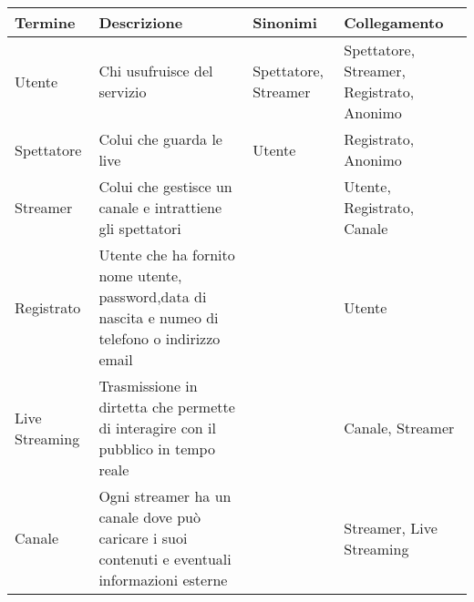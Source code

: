 \begin{center}
  \begin{tabular}{|p{3cm}|p{3cm}|p{3cm}|p{3cm}|}
    \hline
    Termine &Descrizione & Sinonimi &Collegamento \\
    \hline
    Utente& Chi usufruisce del servizio & Spettatore, Streamer & Spettatore, Streamer, Registrato, Anonimo \\
    \hline
    Spettatore & Colui che guarda le live & Utente & Registrato, Anonimo \\ 
    \hline
    Streamer & Colui che gestisce un canale e intrattiene gli spettatori & &Utente, Registrato, Canale\\
    \hline
    Registrato & Utente che ha fornito nome utente, password,data di nascita e numeo di telefono o indirizzo email & &Utente \\
    \hline
    Live Streaming & Trasmissione in dirtetta che permette di interagire con il pubblico in tempo reale &  & Canale, Streamer \\ 
    \hline
    Canale & Ogni streamer ha un canale dove può caricare i suoi contenuti e eventuali informazioni esterne & & Streamer, Live Streaming \\
    \hline
  \end{tabular}
\end{center}